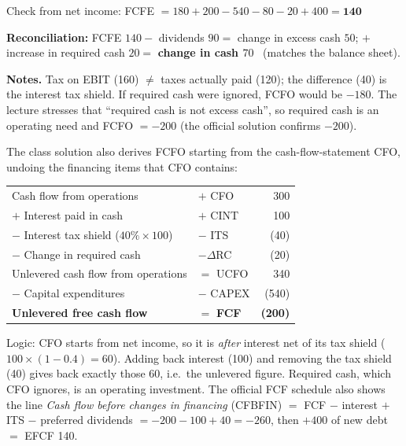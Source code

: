 \begin{exbox}
\medskip
Check from net income: FCFE $=180+200-540-80-20+400=\mathbf{140}$ \checkmark

\textbf{Reconciliation:} FCFE $140-$ dividends $90=$ change in excess cash $50$; $+$ increase in required cash $20=$ \textbf{change in cash $70$} \checkmark\ (matches the balance sheet).

\textbf{Notes.} Tax on EBIT (160) $\neq$ taxes actually paid (120); the difference (40) is the interest tax shield. If required cash were ignored, FCFO would be $-180$. The lecture stresses that ``required cash is not excess cash'', so required cash is an operating need and FCFO $=-200$ (the official solution confirms $-200$).
\end{exbox}

\begin{exbox}
The class solution also derives FCFO starting from the cash-flow-statement CFO, undoing the financing items that CFO contains:
\begin{center}
\begin{tabular}{@{}llr@{}}
\toprule
Cash flow from operations & $+$ CFO & 300\\
$+$ Interest paid in cash & $+$ CINT & 100\\
$-$ Interest tax shield ($40\%\times100$) & $-$ ITS & (40)\\
$-$ Change in required cash & $-\Delta$RC & (20)\\
\midrule
Unlevered cash flow from operations & $=$ UCFO & 340\\
$-$ Capital expenditures & $-$ CAPEX & (540)\\
\midrule
\textbf{Unlevered free cash flow} & $=$ \textbf{FCF} & \textbf{(200)}\\
\bottomrule
\end{tabular}
\end{center}
Logic: CFO starts from net income, so it is \emph{after} interest net of its tax shield ($100\times(1-0.4)=60$). Adding back interest (100) and removing the tax shield (40) gives back exactly those 60, i.e.\ the unlevered figure. Required cash, which CFO ignores, is an operating investment. The official FCF schedule also shows the line \emph{Cash flow before changes in financing} (CFBFIN) $=$ FCF $-$ interest $+$ ITS $-$ preferred dividends $=-200-100+40=-260$, then $+400$ of new debt $=$ EFCF 140.
\end{exbox}

